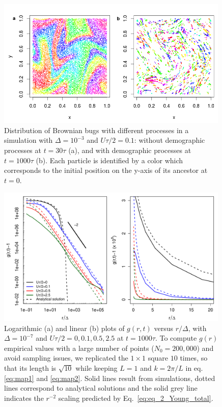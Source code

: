 \begin{figure}[H]
\begin{center}
\includegraphics[width=0.99\textwidth]{../code/figure/spatial_distribution_Fig2.png}
  \caption{Distribution of Brownian bugs with different processes in a simulation with $\Delta=10^{-3}$ and $U\tau/2=0.1$: without demographic processes at $t=30\tau$ (a), and with demographic processes at $t=1000\tau$ (b). Each particle is identified by a color which corresponds to the initial position on the y-axis of its ancestor at $t=0$.}
  \label{fig:spatial_fig2}
\end{center}
  \end{figure}


\begin{figure}[H]
\begin{center}
 \includegraphics[width=0.99\textwidth]{../code/figure/pcf_test_Utot_modif_dx_dp.pdf}
 \caption{Logarithmic (a) and linear (b) plots of $g(r,t)$ versus $r/\Delta$, with $\Delta=10^{-7}$ and $U\tau/2=0,0.1,0.5,2.5$ at $t=1000\tau$. To compute $g(r)$ empirical values with a large number of points ($N_0=200,000$) and avoid sampling issues, we replicated the $1\times 1$ square $10$ times, so that its length is $\sqrt{10}$ while keeping $L=1$ and $k=2\pi/L$ in eq. \ref{eq:map1} and \ref{eq:map2}. Solid lines result from simulations, dotted lines correspond to analytical solutions and the solid grey line indicates the $r^{-2}$ scaling predicted by Eq.~\ref{eq:eq_2_Young_total}.}
  \label{fig:pcf_Fig3}
\end{center}
  \end{figure} 
 
